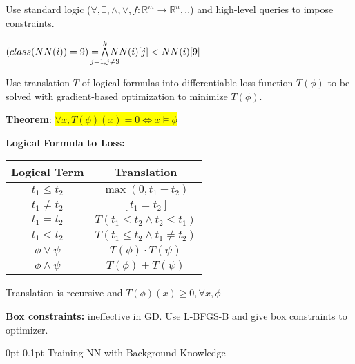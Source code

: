 \documentclass[11pt,landscape,a4paper,fleqn]{article}
\makeatletter
\renewcommand{\subsection}{\@startsection{subsection}{1}{0mm}%
                                {0pt}%
                                {0.1pt}%
                            	{\color{myorange2}\sffamily\small}}
\newcommand{\mhl}[1]{\setlength{\fboxsep}{0pt}\colorbox{yellow}{#1}}
\makeatother
\begin{document}
\begin{multicols*}{4}
Use standard logic ($\forall, \exists, \land, \lor, f:\mathbb{R}^m \rightarrow \mathbb{R}^n,..$) and high-level queries to impose constraints.

$(class(NN(i)) = 9) = \hspace*{-4mm} \bigwedge\limits_{j=1,j \neq 9}^k \hspace*{-4mm} NN(i)[j] < NN(i)[9]$

Use translation $T$ of logical formulas into differentiable loss function $T(\phi)$ to be solved with gradient-based optimization to minimize $T(\phi)$.

\textbf{Theorem}: \mhl{$\forall x, T(\phi)(x) = 0 \Longleftrightarrow x \vDash \phi$}

\vspace*{1mm}
\textbf{Logical Formula to Loss:}
\vspace*{-2mm}
\begin{center}
\renewcommand{\arraystretch}{1.1}
\begin{tabular}{cc}
	\hline 
	Logical Term & Translation \\ 
	\hline 
	$t_1 \leq t_2$ & $\max(0, t_1 - t_2)$ \\ 

	$t_1 \neq t_2$ & $[t_1 = t_2]$ \\ 

	$t_1 = t_2$ & $T(t_1 \leq t_2 \land t_2 \leq t_1)$ \\ 

	$t_1 < t_2$ & $T(t_1 \leq t_2 \land t_1 \neq t_2)$ \\ 

	$\phi \lor \psi$ & $T(\phi) \cdot T(\psi)$ \\ 

	$\phi \land \psi$ & $T(\phi) + T(\psi)$ \\ 
	\hline 
\end{tabular} 
\end{center}
\vspace*{-2mm}

Translation is recursive and $T(\phi)(x) \geq 0, \forall x, \phi$

\textbf{Box constraints:} ineffective in GD. Use L-BFGS-B and give box constraints to optimizer.

\vspace*{1mm}
\subsection{Training NN with Background Knowledge}


\end{multicols*}
\end{document}

